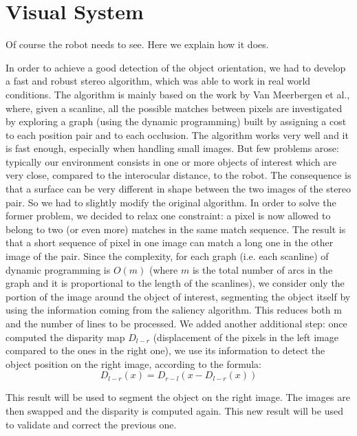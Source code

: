 \section{Visual System}
Of course the robot needs to see. Here we explain how it does.


In order to achieve a good detection of the object orientation, we had to develop a fast and robust stereo algorithm, which was able to work in real world conditions.
The algorithm is mainly based on the work by Van Meerbergen et al.,  where, given a scanline, all the possible matches between pixels are investigated by exploring a graph (using the dynamic programming) built by assigning a cost to each position pair and to each occlusion. The algorithm works very well and it is fast enough, especially when handling small images. But few problems arose: typically our environment consists in one or more objects of interest which are very close, compared to the interocular distance, to the robot. The consequence is that a surface can be very different in shape between the two images of the stereo pair. So we had to slightly modify the original algorithm. In order to solve the former problem, we decided to relax one constraint: a pixel is now allowed to belong to two (or even more) matches in the same match sequence. The result is that a short sequence of pixel in one image can match a long one in the other image of the pair. 
Since the complexity, for each graph (i.e. each scanline) of dynamic programming is $O(m)$ (where $m$ is the total number of arcs in the graph and it is proportional to the length of the scanlines), we consider only the portion of the image around the object of interest, segmenting the object itself by using the information coming from the saliency algorithm. This reduces both m and the number of  lines to be processed.
We added another additional step: once computed the disparity map $D_{l-r}$ (displacement of the pixels in the left image compared to the ones in the right one), we use its information to detect the object position on the right image, according to the formula: 
\begin{equation}D_{l-r}(x)=D_{r-l}(x-D_{l-r}(x))\end{equation}

This result will be used to segment the object on the right image. The images are then swapped and the disparity is computed again. This new result will be used to validate and correct the previous one. 

